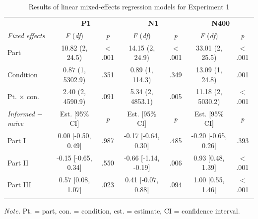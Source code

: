\documentclass[
  english,
  man,11pt,floatsintext]{apa7}
\begin{document}
\begin{table}[tbp]

\begin{center}
\begin{threeparttable}

\caption{\label{tab:exp1-table}Results of linear mixed-effects regression models for Experiment 1}

\footnotesize{

\begin{tabular}{lcccccc}
\toprule
 & \multicolumn{2}{c}{\textbf{P1}} & \multicolumn{2}{c}{\textbf{N1}} & \multicolumn{2}{c}{\textbf{N400}} \\
\cmidrule(r){2-3} \cmidrule(r){4-5} \cmidrule(r){6-7}
\textit{Fixed effects} & \textit{F} (\textit{df}) & \textit{p} & \textit{F} (\textit{df}) & \textit{p} & \textit{F} (\textit{df}) & \textit{p}\\
\midrule
Part & 10.82 (2, 24.5) & < .001 & 14.15 (2, 24.9) & < .001 & 33.01 (2, 25.5) & < .001\\
Condition & 0.87 (1, 5302.9) & .351 & 0.89 (1, 114.3) & .349 & 13.09 (1, 24.8) & .001\\
Pt. × con. & 2.40 (2, 4590.9) & .091 & 5.34 (2, 4853.1) & .005 & 11.18 (2, 5030.2) & < .001\\
\textit{Informed $-$  naive} & Est. [95\% CI] & \textit{p} & Est. [95\% CI] & \textit{p} & Est. [95\% CI] & \textit{p}\\ \midrule
Part I & 0.00 [-0.50, 0.49] & .987 & -0.17 [-0.64, 0.30] & .485 & -0.20 [-0.65, 0.26] & .393\\
Part II & -0.15 [-0.65, 0.34] & .550 & -0.66 [-1.14, -0.19] & .006 & 0.93 [0.48, 1.39] & < .001\\
Part III & 0.57 [0.08, 1.07] & .023 & 0.41 [-0.07, 0.88] & .094 & 1.00 [0.55, 1.46] & < .001\\
\bottomrule
\addlinespace
\end{tabular}

}

\begin{tablenotes}[para]
\normalsize{\textit{Note.} Pt. = part, con. = condition, est. = estimate, CI = confidence interval.}
\end{tablenotes}

\end{threeparttable}
\end{center}

\end{table}
\end{document}
